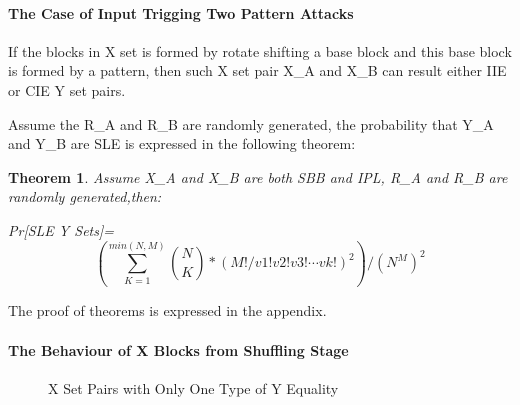 \documentclass{article}
\newtheorem{theorem}{Theorem}[section]
\begin{document}
\paragraph{The Case of Input Trigging Two Pattern Attacks}
If the blocks in X set is formed by rotate shifting a base block and this base block is formed by a pattern, then such X set pair X\_A and X\_B can result either IIE or CIE Y set pairs.

Assume the R\_A and R\_B are randomly generated, the probability that Y\_A and Y\_B are SLE is expressed in the following theorem:
\begin{theorem}
Assume X\_A and X\_B are both SBB and IPL, R\_A and R\_B are randomly generated,then:

Pr[SLE Y Sets]=
\begin{displaymath}
(\sum_{K=1}^{min(N,M)} \binom{N}{K} * (M!/v1!v2!v3! \cdots vk!) ^ 2 )/(N^M)^2
\end{displaymath}
\end{theorem}
The proof of theorems is expressed in the appendix.

\paragraph{The Behaviour of X Blocks from Shuffling Stage}
\begin{figure}
\centering
{}
\caption{X Set Pairs with Only One Type of Y Equality}
 \label{fig:y_e_single} %
\end{figure}
\end{document}
